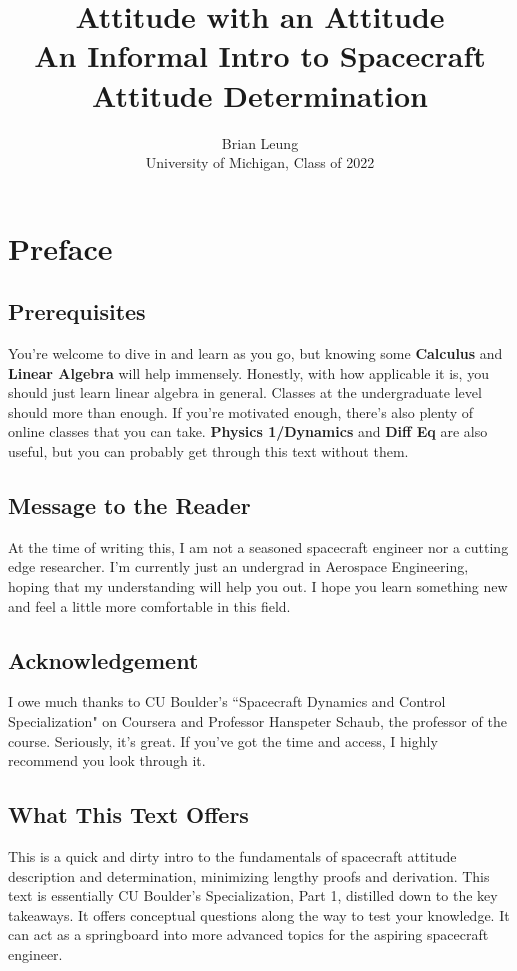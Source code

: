 \documentclass[a4paper,14pt]{extreport}
\title{Attitude with an Attitude \\
\large An Informal Intro to Spacecraft Attitude Determination}
\author{Brian Leung\\University of Michigan, Class of 2022}
\begin{document}
\maketitle
\setcounter{tocdepth}{0}
\tableofcontents{}
\chapter{Preface}
\section{Prerequisites}
You're welcome to dive in and learn as you go, but knowing some \textbf{Calculus} and \textbf{Linear Algebra} will help immensely. Honestly, with how applicable it is, you should just learn linear algebra in general. Classes at the undergraduate level should more than enough. If you're motivated enough, there's also plenty of online classes that you can take. \textbf{Physics 1/Dynamics} and \textbf{Diff Eq} are also useful, but you can probably get through this text without them.

\section{Message to the Reader}
At the time of writing this, I am not a seasoned spacecraft engineer nor a cutting edge researcher. I'm currently just an undergrad in Aerospace Engineering, hoping that my understanding will help you out. I hope you learn something new and feel a little more comfortable in this field.

\section{Acknowledgement}
I owe much thanks to CU Boulder's ``Spacecraft Dynamics and Control Specialization" on Coursera and Professor Hanspeter Schaub, the professor of the course. Seriously, it's great. If you've got the time and access, I highly recommend you look through it.

\section{What This Text Offers} 
This is a quick and dirty intro to the fundamentals of spacecraft attitude description and determination, minimizing lengthy proofs and derivation. This text is essentially CU Boulder's Specialization, Part 1, distilled down to the key takeaways. It offers conceptual questions along the way to test your knowledge. It can act as a springboard into more advanced topics for the aspiring spacecraft engineer.
\end{document}
